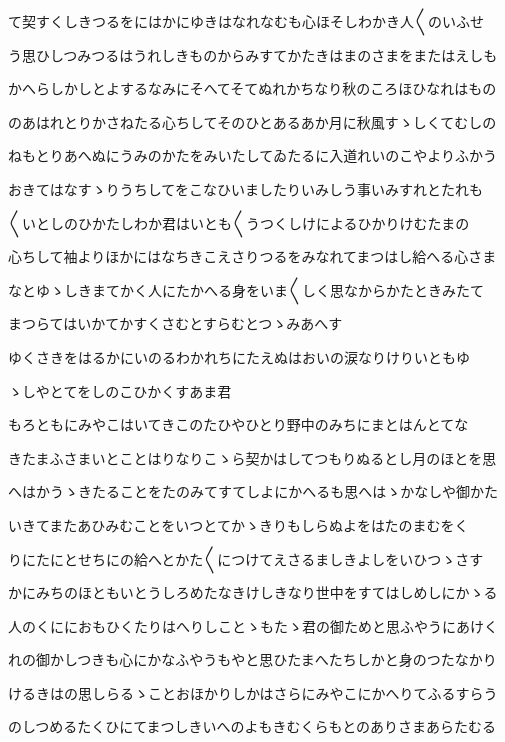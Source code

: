 \documentclass[a4paper,11pt,landscape]{ltjtarticle}
\begin{document}
て契すくしきつるをにはかにゆきはなれなむも心ほそしわかき人〱のいふせ
\par\medskip
う思ひしつみつるはうれしきものからみすてかたきはまのさまをまたはえしも
\par\medskip
かへらしかしとよするなみにそへてそてぬれかちなり秋のころほひなれはもの
\par\medskip
のあはれとりかさねたる心ちしてそのひとあるあか月に秋風すゝしくてむしの
\par\medskip
ねもとりあへぬにうみのかたをみいたしてゐたるに入道れいのこやよりふかう
\par\medskip
おきてはなすゝりうちしてをこなひいましたりいみしう事いみすれとたれも
\par\medskip
〱いとしのひかたしわか君はいとも〱うつくしけによるひかりけむたまの
\par\medskip
心ちして袖よりほかにはなちきこえさりつるをみなれてまつはし給へる心さま
\par\medskip
なとゆゝしきまてかく人にたかへる身をいま〱しく思なからかたときみたて
\par\medskip
まつらてはいかてかすくさむとすらむとつゝみあへす
\par\medskip
ゆくさきをはるかにいのるわかれちにたえぬはおいの涙なりけりいともゆ
\par\medskip
ゝしやとてをしのこひかくすあま君
\par\medskip
もろともにみやこはいてきこのたひやひとり野中のみちにまとはんとてな
\par\medskip
きたまふさまいとことはりなりこゝら契かはしてつもりぬるとし月のほとを思
\par\medskip
へはかうゝきたることをたのみてすてしよにかへるも思へはゝかなしや御かた
\par\medskip
いきてまたあひみむことをいつとてかゝきりもしらぬよをはたのまむをく
\par\medskip
りにたにとせちにの給へとかた〱につけてえさるましきよしをいひつゝさす
\par\medskip
かにみちのほともいとうしろめたなきけしきなり世中をすてはしめしにかゝる
\par\medskip
人のくににおもひくたりはへりしことゝもたゝ君の御ためと思ふやうにあけく
\par\medskip
れの御かしつきも心にかなふやうもやと思ひたまへたちしかと身のつたなかり
\par\medskip
けるきはの思しらるゝことおほかりしかはさらにみやこにかへりてふるすらう
\par\medskip
のしつめるたくひにてまつしきいへのよもきむくらもとのありさまあらたむる
\par\medskip
\end{document}

